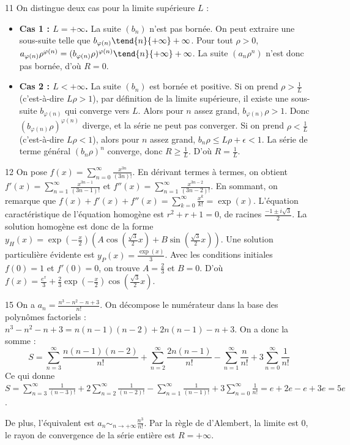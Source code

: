 \begin{correction}{11}
On distingue deux cas pour la limite supérieure $L$ : 
\begin{itemize}
 \item \textbf{Cas 1 : $L = +\infty$.} La suite $(b_n)$ n'est pas bornée. On peut extraire une sous-suite telle que $b_{\varphi(n)} \tend{n}{+\infty} +\infty$. 
 Pour tout $\rho > 0$, $a_{\varphi(n)}\rho^{\varphi(n)} = (b_{\varphi(n)}\rho)^{\varphi(n)} \tend{n}{+\infty} +\infty$. La suite $(a_n\rho^n)$ n'est donc pas bornée, d'où $R=0$. 
 \item \textbf{Cas 2 : $L < +\infty$.} La suite $(b_n)$ est bornée et positive. 
 Si on prend $\rho > \frac{1}{L}$ (c'est-à-dire $L\rho > 1$), par définition de la limite supérieure, il existe une sous-suite $b_{\varphi(n)}$ qui converge vers $L$. Alors pour $n$ assez grand, $b_{\varphi(n)}\rho > 1$. Donc $(b_{\varphi(n)}\rho)^{\varphi(n)}$ diverge, et la série ne peut pas converger. 
 Si on prend $\rho < \frac{1}{L}$ (c'est-à-dire $L\rho < 1$), alors pour $n$ assez grand, $b_n \rho \le L\rho + \epsilon < 1$. La série de terme général $(b_n \rho)^n$ converge, donc $R \ge \frac{1}{L}$. 
 D'où $R = \frac{1}{L}$. 
\end{itemize}
\end{correction}

\begin{correction}{12}
On pose $f(x) = \sum_{n=0}^\infty \frac{x^{3n}}{(3n)!}$. 
En dérivant termes à termes, on obtient $f'(x) = \sum_{n=1}^\infty \frac{x^{3n-1}}{(3n-1)!}$ et $f''(x) = \sum_{n=1}^\infty \frac{x^{3n-2}}{(3n-2)!}$. 
En sommant, on remarque que $f(x) + f'(x) + f''(x) = \sum_{k=0}^\infty \frac{x^k}{k!} = \exp(x)$. 
L'équation caractéristique de l'équation homogène est $r^2+r+1=0$, de racines $\frac{-1 \pm i\sqrt{3}}{2}$. 
La solution homogène est donc de la forme $y_H(x) = \exp\left(-\frac{x}{2}\right) \left(A \cos\left(\frac{\sqrt{3}}{2}x\right) + B \sin\left(\frac{\sqrt{3}}{2}x\right)\right)$. 
Une solution particulière évidente est $y_P(x) = \frac{\exp(x)}{3}$. 
Avec les conditions initiales $f(0)=1$ et $f'(0)=0$, on trouve $A = \frac{2}{3}$ et $B = 0$. 
D'où $f(x) = \frac{e^x}{3} + \frac{2}{3}\exp\left(-\frac{x}{2}\right)\cos\left(\frac{\sqrt{3}}{2}x\right)$. 
\end{correction}

\begin{correction}{15}
On a $a_n = \frac{n^3-n^2-n+3}{n!}$. 
On décompose le numérateur dans la base des polynômes factoriels : 
$n^3-n^2-n+3 = n(n-1)(n-2) + 2n(n-1) - n + 3$. 
On a donc la somme :
$$ S = \sum_{n=3}^\infty \frac{n(n-1)(n-2)}{n!} + \sum_{n=2}^\infty \frac{2n(n-1)}{n!} - \sum_{n=1}^\infty \frac{n}{n!} + 3\sum_{n=0}^\infty \frac{1}{n!} $$ 
Ce qui donne $S = \sum_{n=3}^\infty \frac{1}{(n-3)!} + 2\sum_{n=2}^\infty \frac{1}{(n-2)!} - \sum_{n=1}^\infty \frac{1}{(n-1)!} + 3\sum_{n=0}^\infty \frac{1}{n!} = e + 2e - e + 3e = 5e$. 

De plus, l'équivalent est $a_n \sim_{n \to +\infty} \frac{n^3}{n!}$. 
Par la règle de d'Alembert, la limite est 0, le rayon de convergence de la série entière est $R = +\infty$. 
\end{correction}

